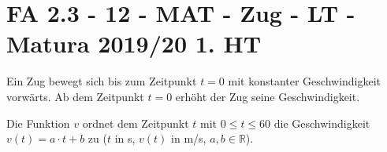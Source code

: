 \section{FA 2.3 - 12 - MAT - Zug - LT - Matura 2019/20 1. HT}

\begin{beispiel}[FA 2.3]{1}
Ein Zug bewegt sich bis zum Zeitpunkt $t=0$ mit konstanter Geschwindigkeit vorwärts. Ab dem Zeitpunkt $t=0$ erhöht der Zug seine Geschwindigkeit.

Die Funktion $v$ ordnet dem Zeitpunkt $t$ mit $0\leq t\leq 60$ die Geschwindigkeit $v(t)=a\cdot t+b$ zu ($t$ in s, $v(t)$ in m/s, $a,b\in\mathbb{R}$).

				
\end{beispiel}